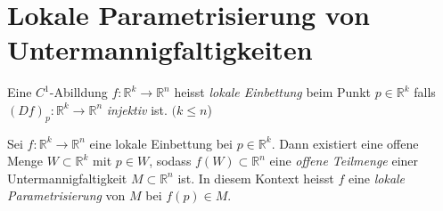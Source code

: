 \documentclass[../main.tex]{subfiles}
\begin{document}
\newpage

\section{Lokale Parametrisierung von Untermannigfaltigkeiten}
\begin{definition}
Eine $C^1$-Abilldung $f : \mathbb{R}^k \to \mathbb{R}^n$ heisst
\emph{lokale Einbettung} beim Punkt $p \in \mathbb{R}^k$ falls $(Df)_p : \mathbb{R}^k \to \mathbb{R}^n$ \emph{injektiv} ist. $(k \leq n$) 
\end{definition}

\begin{theorem}
Sei $f : \mathbb{R}^k \to \mathbb{R}^n$ eine lokale Einbettung bei $p \in \mathbb{R}^k$. Dann existiert eine offene Menge
$W \subset \mathbb{R}^k$ mit $p \in W$, sodass $f(W) \subset \mathbb{R}^n $ eine \emph{offene Teilmenge} einer Untermannigfaltigkeit $M \subset \mathbb{R}^n$ ist. \newline
In diesem Kontext heisst $f$ eine \emph{lokale Parametrisierung} von $M$ bei $f(p) \in M$.
\end{theorem}
\end{document}
